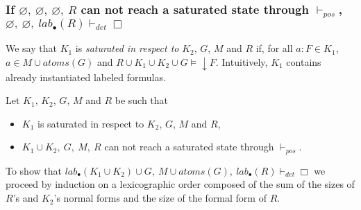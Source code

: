 \documentclass[a4paper,10pt]{report}
\newcommand{\atoms}{\mathit{atoms}}
\newcommand{\pos}{\vdash_\mathit{pos}}
\newcommand{\dett}{\vdash_\mathit{det}}
\newcommand{\T}{\mathit{lab}}
\begin{document}
\subsubsection*{If $\varnothing,\ \varnothing,\ \varnothing,\ R$ can not reach a 
saturated state through $\pos$, $\varnothing,\ \varnothing,\ \T_\bullet(R)\dett\Box$}
We say that $K_1$ is \emph{saturated in respect to} $K_2$, $G$, $M$ and $R$ if, for all
$a:F\in K_1$, $a\in M\cup\atoms(G)$ and $R\cup K_1\cup K_2\cup G\vDash\downarrow F$. Intuitively,
$K_1$ contains already instantiated labeled formulas.

\noindent
Let $K_1$, $K_2$, $G$, $M$ and $R$ be such that
\begin{itemize}
 \item $K_1$ is saturated in respect to $K_2$, $G$, $M$ and $R$,
 \item $K_1\cup K_2,\ G,\ M,\ R$ can not reach a saturated state through $\pos$.
\end{itemize}
To show that 
$\T_\bullet(K_1\cup K_2)\cup G,\ M\cup\atoms(G),\ \T_\bullet(R)\dett\Box$ we proceed by induction
on a lexicographic order composed of the sum of the sizes of $R$'s and $K_2$'s normal forms
and the size of the formal form of $R$.
\end{document}
